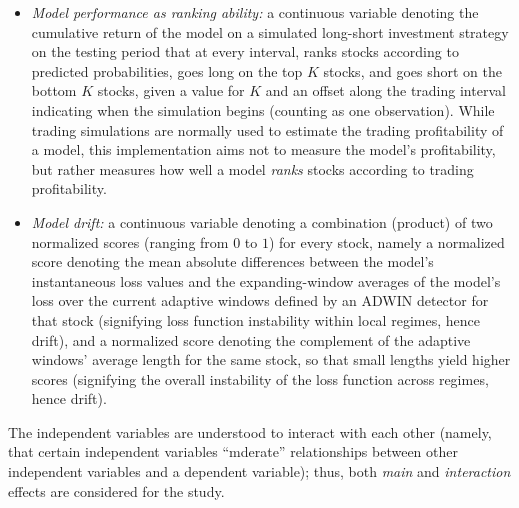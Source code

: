 \documentclass[stu,floatsintext]{apa7}
\begin{document}
\begin{enumerate}
\begin{itemize}
  \item \textit{Model performance as ranking ability:} a continuous variable denoting the cumulative return of the model on a simulated long-short investment strategy on the testing period that at every interval, ranks stocks according to predicted probabilities, goes long on the top $K$ stocks, and goes short on the bottom $K$ stocks, given a value for $K$ and an offset along the trading interval indicating when the simulation begins (counting as one observation). While trading simulations are normally used to estimate the trading profitability of a model, this implementation aims not to measure the model's profitability, but rather measures how well a model \textit{ranks} stocks according to trading profitability.
  \item \textit{Model drift:} a continuous variable denoting a combination (product) of two normalized scores (ranging from $0$ to $1$) for every stock, namely a normalized score denoting the mean absolute differences between the model's instantaneous loss values and the expanding-window averages of the model's loss over the current adaptive windows defined by an ADWIN detector for that stock (signifying loss function instability within local regimes, hence drift), and a normalized score denoting the complement of the adaptive windows' average length for the same stock, so that small lengths yield higher scores (signifying the overall instability of the loss function across regimes, hence drift).
  \end{itemize}
\end{enumerate}
The independent variables are understood to interact with each other (namely, that certain independent variables ``mderate'' relationships between other independent variables and a dependent variable); thus, both \textit{main} and \textit{interaction} effects are considered for the study.
\end{document}
